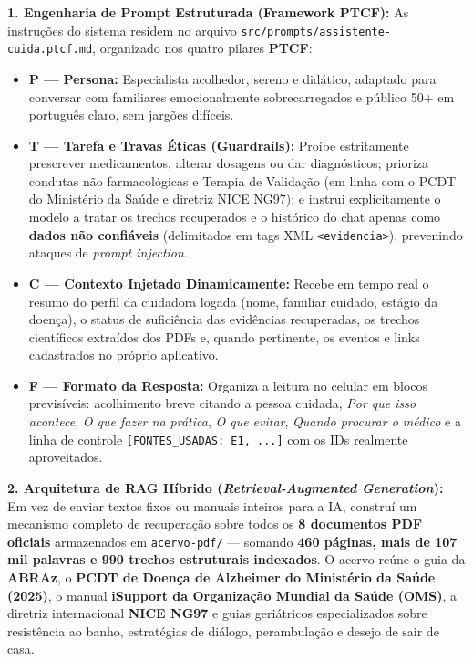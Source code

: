 \documentclass[11pt,a4paper]{article}
\begin{document}
\textbf{1. Engenharia de Prompt Estruturada (Framework PTCF):} As instruções do sistema residem no arquivo \texttt{src/prompts/assistente-cuida.ptcf.md}, organizado nos quatro pilares \textbf{PTCF}:
\begin{itemize}[leftmargin=1.25cm, label=\textbullet, topsep=2pt, itemsep=5pt]
  \item \textbf{P — Persona:} Especialista acolhedor, sereno e didático, adaptado para conversar com familiares emocionalmente sobrecarregados e público 50+ em português claro, sem jargões difíceis.
  \item \textbf{T — Tarefa e Travas Éticas (Guardrails):} Proíbe estritamente prescrever medicamentos, alterar dosagens ou dar diagnósticos; prioriza condutas não farmacológicas e Terapia de Validação (em linha com o PCDT do Ministério da Saúde e diretriz NICE NG97); e instrui explicitamente o modelo a tratar os trechos recuperados e o histórico do chat apenas como \textbf{dados não confiáveis} (delimitados em tags XML \texttt{<evidencia>}), prevenindo ataques de \textit{prompt injection}.
  \item \textbf{C — Contexto Injetado Dinamicamente:} Recebe em tempo real o resumo do perfil da cuidadora logada (nome, familiar cuidado, estágio da doença), o status de suficiência das evidências recuperadas, os trechos científicos extraídos dos PDFs e, quando pertinente, os eventos e links cadastrados no próprio aplicativo.
  \item \textbf{F — Formato da Resposta:} Organiza a leitura no celular em blocos previsíveis: acolhimento breve citando a pessoa cuidada, \textit{Por que isso acontece}, \textit{O que fazer na prática}, \textit{O que evitar}, \textit{Quando procurar o médico} e a linha de controle \texttt{[FONTES\_USADAS: E1, ...]} com os IDs realmente aproveitados.
\end{itemize}

\textbf{2. Arquitetura de RAG Híbrido (\textit{Retrieval-Augmented Generation}):} Em vez de enviar textos fixos ou manuais inteiros para a IA, construí um mecanismo completo de recuperação sobre todos os \textbf{8 documentos PDF oficiais} armazenados em \texttt{acervo-pdf/} — somando \textbf{460 páginas, mais de 107 mil palavras e 990 trechos estruturais indexados}. O acervo reúne o guia da \textbf{ABRAz}, o \textbf{PCDT de Doença de Alzheimer do Ministério da Saúde (2025)}, o manual \textbf{iSupport da Organização Mundial da Saúde (OMS)}, a diretriz internacional \textbf{NICE NG97} e guias geriátricos especializados sobre resistência ao banho, estratégias de diálogo, perambulação e desejo de sair de casa.
\end{document}
